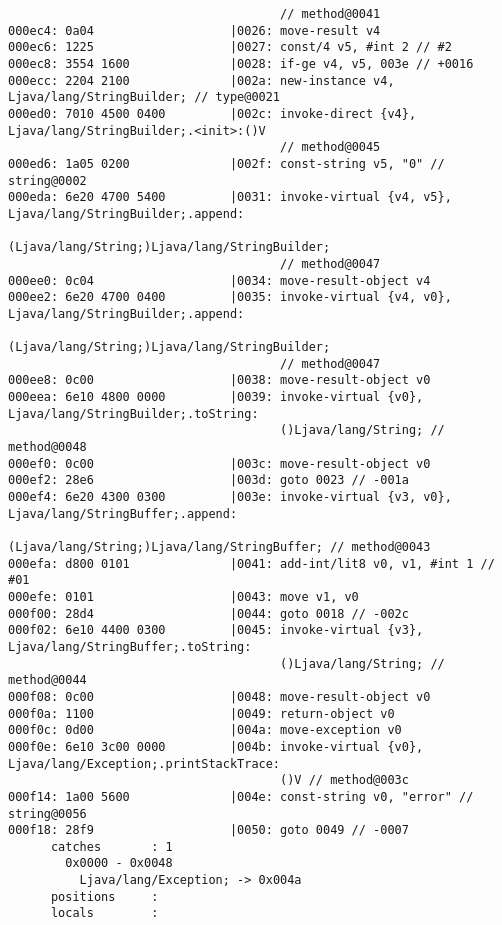 \begin{lstlisting}
                                      // method@0041
000ec4: 0a04                   |0026: move-result v4
000ec6: 1225                   |0027: const/4 v5, #int 2 // #2
000ec8: 3554 1600              |0028: if-ge v4, v5, 003e // +0016
000ecc: 2204 2100              |002a: new-instance v4, Ljava/lang/StringBuilder; // type@0021
000ed0: 7010 4500 0400         |002c: invoke-direct {v4}, Ljava/lang/StringBuilder;.<init>:()V
                                      // method@0045
000ed6: 1a05 0200              |002f: const-string v5, "0" // string@0002
000eda: 6e20 4700 5400         |0031: invoke-virtual {v4, v5}, Ljava/lang/StringBuilder;.append:
                                      (Ljava/lang/String;)Ljava/lang/StringBuilder;
                                      // method@0047
000ee0: 0c04                   |0034: move-result-object v4
000ee2: 6e20 4700 0400         |0035: invoke-virtual {v4, v0}, Ljava/lang/StringBuilder;.append:
                                      (Ljava/lang/String;)Ljava/lang/StringBuilder;
                                      // method@0047
000ee8: 0c00                   |0038: move-result-object v0
000eea: 6e10 4800 0000         |0039: invoke-virtual {v0}, Ljava/lang/StringBuilder;.toString:
                                      ()Ljava/lang/String; // method@0048
000ef0: 0c00                   |003c: move-result-object v0
000ef2: 28e6                   |003d: goto 0023 // -001a
000ef4: 6e20 4300 0300         |003e: invoke-virtual {v3, v0}, Ljava/lang/StringBuffer;.append:
                                      (Ljava/lang/String;)Ljava/lang/StringBuffer; // method@0043
000efa: d800 0101              |0041: add-int/lit8 v0, v1, #int 1 // #01
000efe: 0101                   |0043: move v1, v0
000f00: 28d4                   |0044: goto 0018 // -002c
000f02: 6e10 4400 0300         |0045: invoke-virtual {v3}, Ljava/lang/StringBuffer;.toString:
                                      ()Ljava/lang/String; // method@0044
000f08: 0c00                   |0048: move-result-object v0
000f0a: 1100                   |0049: return-object v0
000f0c: 0d00                   |004a: move-exception v0
000f0e: 6e10 3c00 0000         |004b: invoke-virtual {v0}, Ljava/lang/Exception;.printStackTrace:
                                      ()V // method@003c
000f14: 1a00 5600              |004e: const-string v0, "error" // string@0056
000f18: 28f9                   |0050: goto 0049 // -0007
      catches       : 1
        0x0000 - 0x0048
          Ljava/lang/Exception; -> 0x004a
      positions     :
      locals        :


\end{lstlisting}
